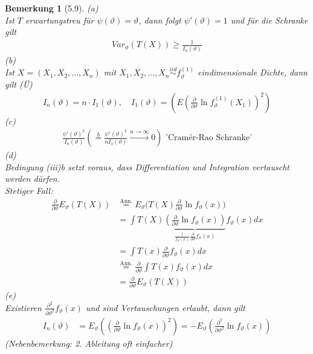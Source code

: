 \documentclass[a4paper,openany]{book}
\theoremstyle{mytheoremstyle}
\newtheorem*{bem}{Bemerkung}
\theoremstyle{mytheoremstyle2}
\begin{document}
\begin{bem}[5.9]
  (a)\\
  Ist $T$ erwartungstreu für $\psi (\vartheta )=\vartheta $, dann folgt $\psi '(\vartheta )=1$ und für die Schranke gilt
  \begin{align*}
    Var _{\vartheta }(T(X))\geq \frac{1}{I_n(\vartheta )}
  \end{align*}
  (b)\\
  Ist $X=(X_1,X_2,...,X_n)$ mit $X_1,X_2,...,X_n \overset{iid}\sim f _{\vartheta }^{(1)}$ eindimensionale Dichte, dann gilt (Ü)
  \begin{align*}
    I_n(\vartheta )=n \cdot I_1(\vartheta ), \quad I_1 (\vartheta )=\left(E \left(\frac{\partial }{\partial \vartheta }\ln f _{\vartheta }^{(1)}(X_1)\right)^2\right)
  \end{align*}
  (c) 
  \begin{align*}
    \frac{\psi' (\vartheta )^2}{I_n(\vartheta )}\left(\overset{b}=\frac{\psi '(\vartheta )^2}{n I_1(\vartheta )}\overset{n\to \infty }\longrightarrow 0\right)\text{ 'Cramér-Rao Schranke'}
  \end{align*}
  (d) \\
  Bedingung (iii)b setzt voraus, dass Differentiation und Integration vertauscht werden dürfen. \\
  Stetiger Fall:
  \begin{align*}
    \frac{\partial }{\partial \vartheta }E _{\vartheta }(T(X))
    &\overset{\text{Ann.}}=E _{\vartheta }\bigg(T(X)\frac{\partial }{\partial \vartheta }\ln f _{\vartheta }(x)\bigg) \\
    &=\int{T(X)\underbrace{\left(\frac{\partial }{\partial \vartheta }\ln f _{\vartheta }(x)\right)}_{\frac{1}{f _{\vartheta }(x)}\frac{\partial }{\partial \vartheta }f _{\vartheta }(x)}f _{\vartheta }(x)dx} \\
    &=\int{T(x) \frac{\partial }{\partial \vartheta }f _{\vartheta }(x)dx} \\
    &\!\!\!\overset{\text{Ann.}}=\frac{\partial }{\partial \vartheta }\int{T(x)f _{\vartheta }(x)dx}\\
    &=\frac{\partial }{\partial \vartheta }E _{\vartheta }(T(X))
  \end{align*}
  (e) \\
  Existieren $\frac{\partial^2 }{\partial \vartheta ^2}f _{\vartheta }(x)$ und sind Vertauschungen erlaubt, dann gilt \begin{align*}
    I _n(\vartheta )
    &=E _{\vartheta }\left(\left(\frac{\partial }{\partial \vartheta }\ln f _{\vartheta }(x)\right)^2\right) 
    =-E _{\vartheta }\left(\frac{\partial^2 }{\partial \vartheta ^2}\ln f _{\vartheta }(x)\right)
  \end{align*}
  (Nebenbemerkung: 2. Ableitung oft einfacher)
\end{bem}
\end{document}
